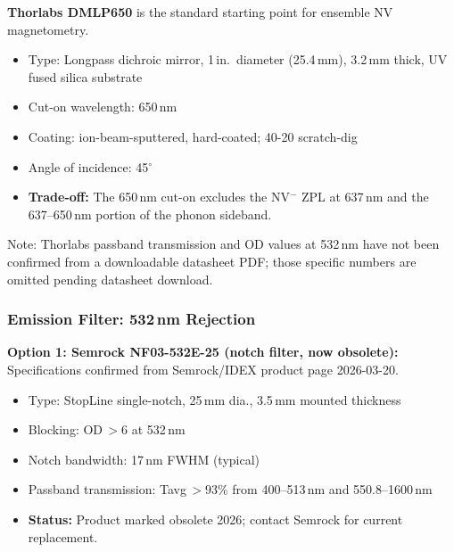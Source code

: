 \textbf{Thorlabs DMLP650} is the standard starting point for ensemble NV
magnetometry.\cite{Barry2020}

\begin{itemize}
  \item Type: Longpass dichroic mirror, 1\,in.\ diameter (25.4\,mm),
    3.2\,mm thick, UV fused silica substrate \cite{ThorlabsDMLP650_web}
  \item Cut-on wavelength: 650\,nm \cite{ThorlabsDMLP650_web}
  \item Coating: ion-beam-sputtered, hard-coated; 40-20 scratch-dig \cite{ThorlabsDMLP650_web}
  \item Angle of incidence: 45$^\circ$ \cite{ThorlabsDMLP650_web}
  \item \textbf{Trade-off:} The 650\,nm cut-on excludes the NV$^-$ ZPL at
    637\,nm and the 637--650\,nm portion of the phonon sideband.
\end{itemize}

Note: Thorlabs passband transmission and OD values at 532\,nm have not been
confirmed from a downloadable datasheet PDF; those specific numbers are
omitted pending datasheet download. 

\subsubsection{Emission Filter: 532\,nm Rejection}

\textbf{Option 1: Semrock NF03-532E-25 (notch filter, now obsolete):}
Specifications confirmed from Semrock/IDEX product page 2026-03-20.\cite{SemrockNF03_web}
\begin{itemize}
  \item Type: StopLine single-notch, 25\,mm dia., 3.5\,mm mounted thickness
  \item Blocking: OD\,$> 6$ at 532\,nm \cite{SemrockNF03_web}
  \item Notch bandwidth: 17\,nm FWHM (typical) \cite{SemrockNF03_web}
  \item Passband transmission: Tavg\,$> 93$\% from 400--513\,nm and
    550.8--1600\,nm \cite{SemrockNF03_web}
  \item \textbf{Status:} Product marked obsolete 2026; contact
    Semrock for current replacement.
\end{itemize}


